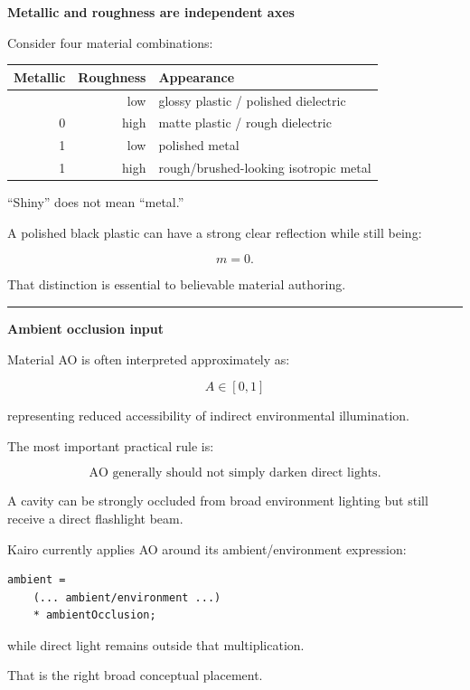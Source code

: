 \textbf{Metallic and roughness are independent axes}

Consider four material combinations:

{\def\LTcaptype{none} %
\begin{longtable}[]{@{}rrl@{}}
\toprule\noalign{}
Metallic & Roughness & Appearance \\
\midrule\noalign{}
\endhead
\bottomrule\noalign{}
\endlastfoot
0 & low & glossy plastic / polished dielectric \\
0 & high & matte plastic / rough dielectric \\
1 & low & polished metal \\
1 & high & rough/brushed-looking isotropic metal \\
\end{longtable}
}

``Shiny'' does not mean ``metal.''

A polished black plastic can have a strong clear reflection while still being:

\[
m=0.
\]

That distinction is essential to believable material authoring.

\begin{center}\rule{0.5\linewidth}{0.5pt}\end{center}

\textbf{Ambient occlusion input}

Material AO is often interpreted approximately as:

\[
A\in[0,1]
\]

representing reduced accessibility of indirect environmental illumination.

The most important practical rule is:

\[
\boxed{
\text{AO generally should not simply darken direct lights}.
}
\]

A cavity can be strongly occluded from broad environment lighting but still receive a direct flashlight beam.

Kairo currently applies AO around its ambient/environment expression:

\begin{verbatim}
ambient =
    (... ambient/environment ...)
    * ambientOcclusion;
\end{verbatim}

while direct light remains outside that multiplication.

That is the right broad conceptual placement.

